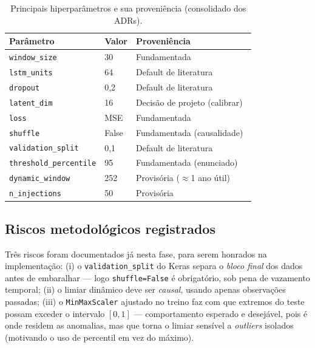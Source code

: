 \begin{table}[h]
\centering
\caption{Principais hiperparâmetros e sua proveniência (consolidado dos ADRs).}
\label{tab:hparams}
\small
\begin{tabular}{lll}
\toprule
\textbf{Parâmetro} & \textbf{Valor} & \textbf{Proveniência} \\
\midrule
\texttt{window\_size}        & 30      & Fundamentada~\cite{li2020lstm,valkov2019lstm} \\
\texttt{lstm\_units}         & 64      & Default de literatura~\cite{valkov2019lstm} \\
\texttt{dropout}             & 0{,}2   & Default de literatura~\cite{valkov2019lstm} \\
\texttt{latent\_dim}         & 16      & Decisão de projeto (calibrar) \\
\texttt{loss}                & MSE     & Fundamentada~\cite{li2020lstm} \\
\texttt{shuffle}             & False   & Fundamentada (causalidade)~\cite{valkov2019lstm} \\
\texttt{validation\_split}   & 0{,}1   & Default de literatura~\cite{valkov2019lstm} \\
\texttt{threshold\_percentile} & 95    & Fundamentada (enunciado) \\
\texttt{dynamic\_window}     & 252     & Provisória ($\approx$1 ano útil) \\
\texttt{n\_injections}       & 50      & Provisória \\
\bottomrule
\end{tabular}
\end{table}

\subsection{Riscos metodológicos registrados}
Três riscos foram documentados já nesta fase, para serem honrados na implementação:
(i) o \texttt{validation\_split} do Keras separa o \emph{bloco final} dos dados antes de
embaralhar --- logo \texttt{shuffle=False} é obrigatório, sob pena de vazamento temporal;
(ii) o limiar dinâmico deve ser \emph{causal}, usando apenas observações passadas;
(iii) o \texttt{MinMaxScaler} ajustado no treino faz com que extremos do teste possam
exceder o intervalo $[0,1]$ --- comportamento esperado e desejável, pois é onde residem as
anomalias, mas que torna o limiar sensível a \emph{outliers} isolados (motivando o uso de
percentil em vez do máximo).
